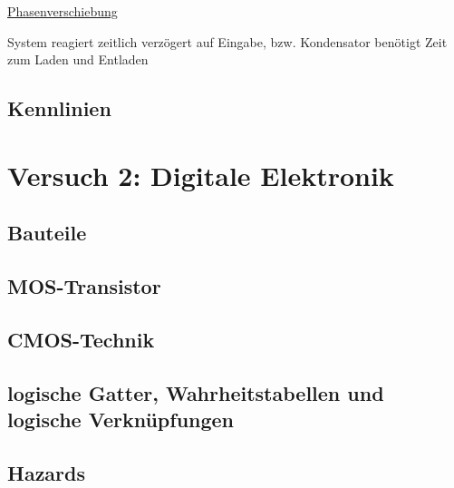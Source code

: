 \documentclass[paper=a4, fontsize=11pt]{scrartcl}
\numberwithin{equation}{section}
\numberwithin{figure}{section}
\numberwithin{table}{section}
\begin{document}
\underline{Phasenverschiebung}

System reagiert zeitlich verzögert auf Eingabe, bzw. Kondensator benötigt Zeit zum Laden und Entladen \\ 


\subsection{Kennlinien}



\newpage

\section{Versuch 2: Digitale Elektronik}



\subsection{Bauteile}



\subsection{MOS-Transistor}



\subsection{CMOS-Technik}



\subsection{logische Gatter, Wahrheitstabellen und logische Verknüpfungen}



\subsection{Hazards}
\end{document}
